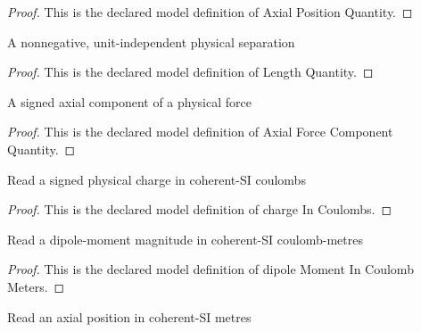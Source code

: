 \begin{proof}
  This is the declared model definition of Axial Position Quantity.
\end{proof}
\begin{definition}
  \label{def:physics:phyx-mini-0911:phyxminiproblems-problemphyxmini0911-lengthquantity}
  A nonnegative, unit-independent physical separation
\end{definition}
\begin{proof}
  This is the declared model definition of Length Quantity.
\end{proof}
\begin{definition}
  \label{def:physics:phyx-mini-0911:phyxminiproblems-problemphyxmini0911-axialforcecomponentquantity}
  A signed axial component of a physical force
\end{definition}
\begin{proof}
  This is the declared model definition of Axial Force Component Quantity.
\end{proof}
\begin{definition}
  \label{def:physics:phyx-mini-0911:phyxminiproblems-problemphyxmini0911-chargeincoulombs}
  Read a signed physical charge in coherent-SI coulombs
\end{definition}
\begin{proof}
  This is the declared model definition of charge In Coulombs.
\end{proof}
\begin{definition}
  \label{def:physics:phyx-mini-0911:phyxminiproblems-problemphyxmini0911-dipolemomentincoulombmeters}
  Read a dipole-moment magnitude in coherent-SI coulomb-metres
\end{definition}
\begin{proof}
  This is the declared model definition of dipole Moment In Coulomb Meters.
\end{proof}
\begin{definition}
  \label{def:physics:phyx-mini-0911:phyxminiproblems-problemphyxmini0911-positioninmeters}
  Read an axial position in coherent-SI metres
\end{definition}

